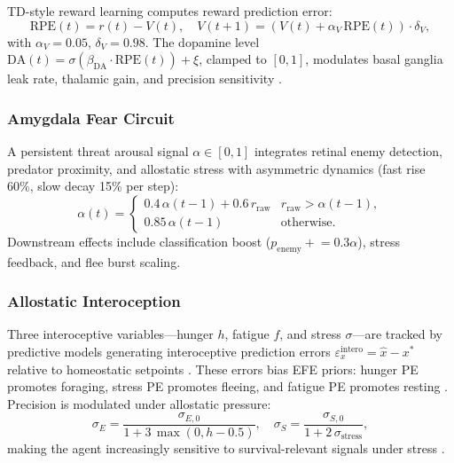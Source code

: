 \documentclass[12pt]{article}
\begin{document}
TD-style reward learning computes reward prediction error:
\begin{equation}\label{eq:dopamine}
  \text{RPE}(t) = r(t) - V(t), \quad
  V(t{+}1) = (V(t) + \alpha_V\,\text{RPE}(t)) \cdot \delta_V,
\end{equation}
with $\alpha_V = 0.05$, $\delta_V = 0.98$.
The dopamine level $\text{DA}(t) = \sigma(\beta_\text{DA} \cdot
\text{RPE}(t)) + \xi$, clamped to $[0,1]$, modulates basal ganglia
leak rate, thalamic gain, and precision sensitivity
\citep{schultz1997}.

\subsubsection{Amygdala Fear Circuit}

A persistent threat arousal signal $\alpha \in [0,1]$ integrates
retinal enemy detection, predator proximity, and allostatic stress
with asymmetric dynamics (fast rise 60\%, slow decay 15\% per step):
\begin{equation}\label{eq:amygdala}
  \alpha(t) = \begin{cases}
    0.4\,\alpha(t{-}1) + 0.6\,r_\text{raw} & r_\text{raw} > \alpha(t{-}1), \\
    0.85\,\alpha(t{-}1) & \text{otherwise}.
  \end{cases}
\end{equation}
Downstream effects include classification boost
($p_\text{enemy} \mathrel{+}= 0.3\alpha$), stress feedback, and
flee burst scaling.

\subsubsection{Allostatic Interoception}

Three interoceptive variables---hunger $h$, fatigue $f$, and
stress $\sigma$---are tracked by predictive models generating
interoceptive prediction errors $\varepsilon_x^\text{intero}
= \hat{x} - x^*$ relative to homeostatic setpoints
\citep{seth2016,barrett2015}.
These errors bias EFE priors: hunger PE promotes foraging, stress PE
promotes fleeing, and fatigue PE promotes resting \citep{pezzulo2015}.
Precision is modulated under allostatic pressure:
\begin{equation}\label{eq:allo_precision}
  \sigma_E = \frac{\sigma_{E,0}}{1 + 3\,\max(0, h - 0.5)},
  \quad
  \sigma_S = \frac{\sigma_{S,0}}{1 + 2\,\sigma_\text{stress}},
\end{equation}
making the agent increasingly sensitive to survival-relevant signals
under stress \citep{stephan2016}.
\end{document}
